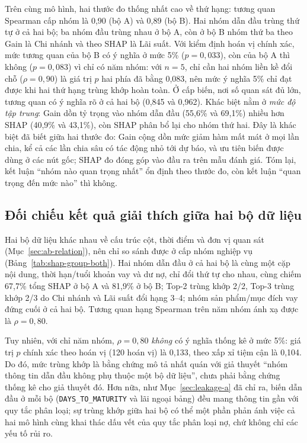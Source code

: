Trên cùng mô hình, hai thước đo thống nhất cao về thứ hạng: tương quan Spearman cấp nhóm là 0,90 (bộ A) và 0,89 (bộ B). Hai nhóm dẫn đầu trùng thứ tự ở cả hai bộ; ba nhóm đầu trùng nhau ở bộ A, còn ở bộ B nhóm thứ ba theo Gain là Chi nhánh và theo SHAP là Lãi suất. Với kiểm định hoán vị chính xác, mức tương quan của bộ B có ý nghĩa ở mức 5\% ($p=0,033$), còn của bộ A thì không ($p=0,083$) vì chỉ có năm nhóm: với $n=5$, chỉ cần hai nhóm liền kề đổi chỗ ($\rho=0,90$) là giá trị $p$ hai phía đã bằng 0,083, nên mức ý nghĩa 5\% chỉ đạt được khi hai thứ hạng trùng khớp hoàn toàn. Ở cấp biến, nơi số quan sát đủ lớn, tương quan có ý nghĩa rõ ở cả hai bộ (0,845 và 0,962). Khác biệt nằm ở \emph{mức độ tập trung}: Gain dồn tỷ trọng vào nhóm dẫn đầu (55,6\% và 69,1\%) nhiều hơn SHAP (40,9\% và 43,1\%), còn SHAP phân bổ lại cho nhóm thứ hai. Đây là khác biệt đã biết giữa hai thước đo: Gain cộng dồn mức giảm hàm mất mát ở mọi lần chia, kể cả các lần chia sâu có tác động nhỏ tới dự báo, và ưu tiên biến được dùng ở các nút gốc; SHAP đo đóng góp vào đầu ra trên mẫu đánh giá. Tóm lại, kết luận ``nhóm nào quan trọng nhất'' ổn định theo thước đo, còn kết luận ``quan trọng đến mức nào'' thì không.

\subsection{Đối chiếu kết quả giải thích giữa hai bộ dữ liệu}
\label{sec:shap-overlap}

Hai bộ dữ liệu khác nhau về cấu trúc cột, thời điểm và đơn vị quan sát (Mục~\ref{sec:ab-relation}), nên chỉ so sánh được ở cấp nhóm nghiệp vụ (Bảng~\ref{tab:shap-group-both}). Hai nhóm dẫn đầu ở cả hai bộ là cùng một cặp nội dung, thời hạn/tuổi khoản vay và dư nợ, chỉ đổi thứ tự cho nhau, cùng chiếm 67,7\% tổng SHAP ở bộ A và 81,9\% ở bộ B; Top-2 trùng khớp 2/2, Top-3 trùng khớp 2/3 do Chi nhánh và Lãi suất đổi hạng 3--4; nhóm sản phẩm/mục đích vay đứng cuối ở cả hai bộ. Tương quan hạng Spearman trên năm nhóm ánh xạ được là $\rho=0,80$.

Tuy nhiên, với chỉ năm nhóm, $\rho=0,80$ \emph{không} có ý nghĩa thống kê ở mức 5\%: giá trị $p$ chính xác theo hoán vị (120 hoán vị) là 0,133, theo xấp xỉ tiệm cận là 0,104. Do đó, mức trùng khớp là bằng chứng mô tả nhất quán với giả thuyết ``nhóm thông tin dẫn đầu không phụ thuộc một bộ dữ liệu'', chưa phải bằng chứng thống kê cho giả thuyết đó. Hơn nữa, như Mục~\ref{sec:leakage-a} đã chỉ ra, biến dẫn đầu ở mỗi bộ (\mbox{\texttt{DAYS\_TO\_MATURITY}} và lãi ngoại bảng) đều mang thông tin gần với quy tắc phân loại; sự trùng khớp giữa hai bộ có thể một phần phản ánh việc cả hai mô hình cùng khai thác dấu vết của quy tắc phân loại nợ, chứ không chỉ các yếu tố rủi ro.

